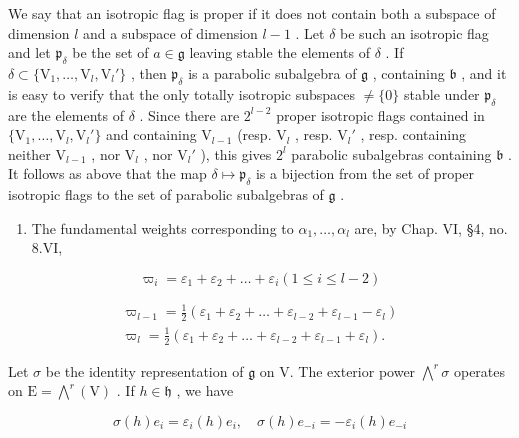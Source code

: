 We say that an isotropic flag is proper if it does not contain both a subspace of dimension \(l\) and a subspace of dimension \(l-1\) . Let \(\delta\) be such an isotropic flag and let \(\mathfrak{p}_{\delta}\) be the set of \(a \in \mathfrak{g}\) leaving stable the elements of \(\delta\) . If \(\delta \subset \{\mathrm{V}_1, \ldots, \mathrm{V}_l, \mathrm{V}_l'\}\) , then \(\mathfrak{p}_{\delta}\) is a parabolic subalgebra of \(\mathfrak{g}\) , containing \(\mathfrak{b}\) , and it is easy to verify that the only totally isotropic subspaces \(\neq \{0\}\) stable under \(\mathfrak{p}_{\delta}\) are the elements of \(\delta\) . Since there are \(2^{l-2}\) proper isotropic flags contained in \(\{\mathrm{V}_1, \ldots, \mathrm{V}_l, \mathrm{V}_l'\}\) and containing \(\mathrm{V}_{l-1}\) (resp. \(\mathrm{V}_l\) , resp. \(\mathrm{V}_l'\) , resp. containing neither \(\mathrm{V}_{l-1}\) , nor \(\mathrm{V}_l\) , nor \(\mathrm{V}_l'\) ), this gives \(2^l\) parabolic subalgebras containing \(\mathfrak{b}\) . It follows as above that the map \(\delta \mapsto \mathfrak{p}_{\delta}\) is a bijection from the set of proper isotropic flags to the set of parabolic subalgebras of \(\mathfrak{g}\) .

\begin{enumerate}
\def\labelenumi{(\Roman{enumi})}
\setcounter{enumi}{3}
\tightlist
\item
  The fundamental weights corresponding to \(\alpha_{1},\ldots,\alpha_{l}\) are, by Chap. VI, §4, no. 8.VI,
\end{enumerate}

\[
\varpi_ {i} = \varepsilon_ {1} + \varepsilon_ {2} + \dots + \varepsilon_ {i} (1 \leq i \leq l - 2)
\]

\[
\begin{array}{c} \varpi_ {l - 1} = \frac {1}{2} (\varepsilon_ {1} + \varepsilon_ {2} + \ldots + \varepsilon_ {l - 2} + \varepsilon_ {l - 1} - \varepsilon_ {l}) \\ \varpi_ {l} = \frac {1}{2} (\varepsilon_ {1} + \varepsilon_ {2} + \ldots + \varepsilon_ {l - 2} + \varepsilon_ {l - 1} + \varepsilon_ {l}). \end{array}
\]

Let \(\sigma\) be the identity representation of \(\mathfrak{g}\) on V. The exterior power \(\bigwedge^{r}\sigma\) operates on \(\mathrm{E} = \bigwedge^{r}(\mathrm{V})\) . If \(h\in \mathfrak{h}\) , we have

\[
\sigma (h) e _ {i} = \varepsilon_ {i} (h) e _ {i}, \quad \sigma (h) e _ {- i} = - \varepsilon_ {i} (h) e _ {- i}
\]

